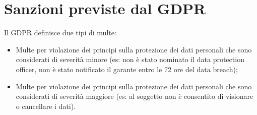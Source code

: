 \section{Sanzioni previste dal GDPR}
Il GDPR definisce due tipi di multe:
\begin{itemize}
    \item Multe per violazione dei principi sulla protezione dei dati personali che sono considerati di severità minore (es: non è stato nominato il data protection officer, non è stato notificato il garante entro le 72 ore del data breach);
    \item Multe per violazione dei principi sulla protezione dei dati personali che sono considerati di severità maggiore (es: al soggetto non è consentito di visionare o cancellare i dati).
\end{itemize}









